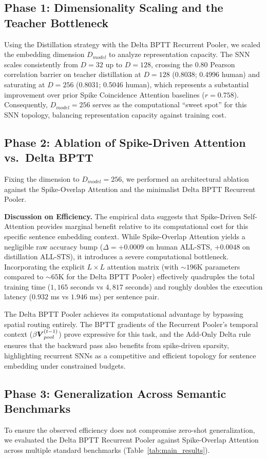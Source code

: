 \documentclass[11pt, conference, compsoc, twoside]{IEEEtran}
\begin{document}
\subsection{Phase 1: Dimensionality Scaling and the Teacher Bottleneck}
Using the Distillation strategy with the Delta BPTT Recurrent Pooler, we scaled the embedding dimension $D_{model}$ to analyze representation capacity. The SNN scales consistently from $D=32$ up to $D=128$, crossing the 0.80 Pearson correlation barrier on teacher distillation at $D=128$ (0.8038; 0.4996 human) and saturating at $D=256$ (0.8031; 0.5046 human), which represents a substantial improvement over prior Spike Coincidence Attention baselines \cite{coincidence2026} ($r=0.758$). Consequently, $D_{model} = 256$ serves as the computational ``sweet spot'' for this SNN topology, balancing representation capacity against training cost.

\subsection{Phase 2: Ablation of Spike-Driven Attention vs.\ Delta BPTT}
Fixing the dimension to $D_{model} = 256$, we performed an architectural ablation against the Spike-Overlap Attention and the minimalist Delta BPTT Recurrent Pooler.

\textbf{Discussion on Efficiency.} The empirical data suggests that Spike-Driven Self-Attention provides marginal benefit relative to its computational cost for this specific sentence embedding context. While Spike-Overlap Attention yields a negligible raw accuracy bump ($\Delta = +0.0009$ on human ALL-STS, $+0.0048$ on distillation ALL-STS), it introduces a severe computational bottleneck. Incorporating the explicit $L \times L$ attention matrix (with $\sim 196$K parameters compared to $\sim 65$K for the Delta BPTT Pooler) effectively quadruples the total training time ($1{,}165$ seconds vs $4{,}817$ seconds) and roughly doubles the execution latency ($0.932$ ms vs $1.946$ ms) per sentence pair.

The Delta BPTT Pooler achieves its computational advantage by bypassing spatial routing entirely. The BPTT gradients of the Recurrent Pooler's temporal context ($\beta \boldsymbol{V}_{pool}^{(t-1)}$) prove expressive for this task, and the Add-Only Delta rule ensures that the backward pass also benefits from spike-driven sparsity, highlighting recurrent SNNs as a competitive and efficient topology for sentence embedding under constrained budgets.

\subsection{Phase 3: Generalization Across Semantic Benchmarks}
To ensure the observed efficiency does not compromise zero-shot generalization, we evaluated the Delta BPTT Recurrent Pooler against Spike-Overlap Attention across multiple standard benchmarks (Table~\ref{tab:main_results}).
\end{document}
